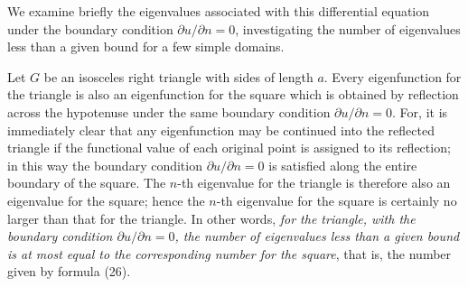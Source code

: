 We examine briefly the eigenvalues associated with this differential equation under the boundary condition $\partial u/\partial n=0$, investigating the number of eigenvalues less than a given bound for a few simple domains.

Let $G$ be an isosceles right triangle with sides of length $a$. Every eigenfunction for the triangle is also an eigenfunction for the square which is obtained by reflection across the hypotenuse under the same boundary condition $\partial u/\partial n=0$. For, it is immediately clear that any eigenfunction may be continued into the reflected triangle if the functional value of each original point is assigned to its reflection; in this way the boundary condition $\partial u/\partial n=0$ is satisfied along the entire boundary of the square. The $n$-th eigenvalue for the triangle is therefore also an eigenvalue for the square; hence the $n$-th eigenvalue for the square is certainly no larger than that for the triangle. In other words, \emph{for the triangle, with the boundary condition $\partial u/\partial n=0$, the number of eigenvalues less than a given bound is at most equal to the corresponding number for the square}, that is, the number given by formula (26).

